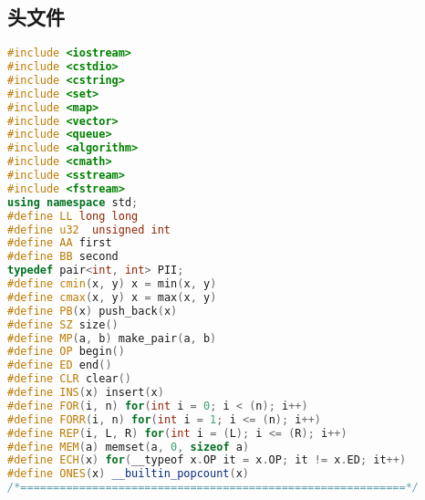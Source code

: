 ﻿\subsection{头文件}
    \begin{lstlisting}[language=C++]
#include <iostream>
#include <cstdio>
#include <cstring>
#include <set>
#include <map>
#include <vector>
#include <queue>
#include <algorithm>
#include <cmath>
#include <sstream>
#include <fstream>
using namespace std;
#define LL long long
#define u32  unsigned int
#define AA first
#define BB second
typedef pair<int, int> PII;
#define cmin(x, y) x = min(x, y)
#define cmax(x, y) x = max(x, y)
#define PB(x) push_back(x)
#define SZ size()
#define MP(a, b) make_pair(a, b)
#define OP begin()
#define ED end()
#define CLR clear()
#define INS(x) insert(x)
#define FOR(i, n) for(int i = 0; i < (n); i++)
#define FORR(i, n) for(int i = 1; i <= (n); i++)
#define REP(i, L, R) for(int i = (L); i <= (R); i++)
#define MEM(a) memset(a, 0, sizeof a)
#define ECH(x) for(__typeof x.OP it = x.OP; it != x.ED; it++)
#define ONES(x) __builtin_popcount(x)
/*===========================================================*/
\end{lstlisting}

